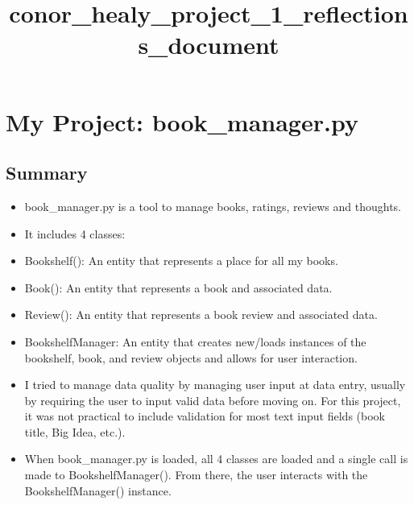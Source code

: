 \documentclass[11pt]{article}
\title{conor\_healy\_project\_1\_reflections\_document}
\providecommand{\tightlist}{%
      \setlength{\itemsep}{0pt}\setlength{\parskip}{0pt}}
\begin{document}
    
    
    \maketitle
    
    

    
    \section{My Project: book\_manager.py}\label{my-project-book_manager.py}

\subsection{Summary}\label{summary}

\begin{itemize}
\tightlist
\item
  book\_manager.py is a tool to manage books, ratings, reviews and
  thoughts.
\item
  It includes 4 classes:
\item
  Bookshelf(): An entity that represents a place for all my books.
\item
  Book(): An entity that represents a book and associated data.
\item
  Review(): An entity that represents a book review and associated data.
\item
  BookshelfManager: An entity that creates new/loads instances of the
  bookshelf, book, and review objects and allows for user interaction.
\item
  I tried to manage data quality by managing user input at data entry,
  usually by requiring the user to input valid data before moving on.
  For this project, it was not practical to include validation for most
  text input fields (book title, Big Idea, etc.).
\item
  When book\_manager.py is loaded, all 4 classes are loaded and a single
  call is made to BookshelfManager(). From there, the user interacts
  with the BookshelfManager() instance.
\end{itemize}
\end{document}
